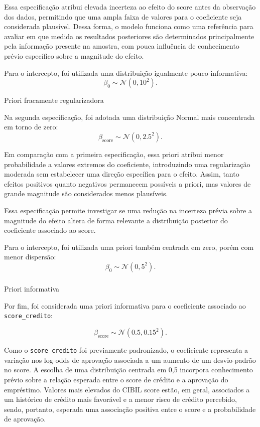 \documentclass[
  brazilian,
  12pt,
  letterpaper,
  DIV=11,
  numbers=noendperiod]{scrartcl}
\makeatletter
\let\oldsubparagraph\subparagraph
\renewcommand{\subparagraph}{
    \@ifstar
      \xxxSubParagraphStar
      \xxxSubParagraphNoStar
  }
\newcommand{\xxxSubParagraphStar}[1]{\oldsubparagraph*{#1}\mbox{}}
\newcommand{\xxxSubParagraphNoStar}[1]{\oldsubparagraph{#1}\mbox{}}
\makeatother
\begin{document}
Essa especificação atribui elevada incerteza ao efeito do score antes da
observação dos dados, permitindo que uma ampla faixa de valores para o
coeficiente seja considerada plausível. Dessa forma, o modelo funciona
como uma referência para avaliar em que medida os resultados posteriores
são determinados principalmente pela informação presente na amostra, com
pouca influência de conhecimento prévio específico sobre a magnitude do
efeito.

Para o intercepto, foi utilizada uma distribuição igualmente pouco
informativa: \[
\beta_{\text{0}} \sim \mathcal{N}(0,10^2).
\]

Priori fracamente regularizadora

Na segunda especificação, foi adotada uma distribuição Normal mais
concentrada em torno de zero: \[
\beta_{\text{score}} \sim \mathcal{N}(0,2.5^2).
\]

Em comparação com a primeira especificação, essa priori atribui menor
probabilidade a valores extremos do coeficiente, introduzindo uma
regularização moderada sem estabelecer uma direção específica para o
efeito. Assim, tanto efeitos positivos quanto negativos permanecem
possíveis a priori, mas valores de grande magnitude são considerados
menos plausíveis.

Essa especificação permite investigar se uma redução na incerteza prévia
sobre a magnitude do efeito altera de forma relevante a distribuição
posterior do coeficiente associado ao score.

Para o intercepto, foi utilizada uma priori também centrada em zero,
porém com menor dispersão: \[
\beta_{\text{0}} \sim \mathcal{N}(0,5^2).
\]

\subparagraph{Priori informativa}\label{priori-informativa}

Por fim, foi considerada uma priori informativa para o coeficiente
associado ao \texttt{score\_credito}:

\[
\beta_{\text{score}} \sim \mathcal{N}(0.5,0.15^2).
\]

Como o \texttt{score\_credito} foi previamente padronizado, o
coeficiente representa a variação nos log-odds de aprovação associada a
um aumento de um desvio-padrão no score. A escolha de uma distribuição
centrada em 0,5 incorpora conhecimento prévio sobre a relação esperada
entre o score de crédito e a aprovação do empréstimo. Valores mais
elevados do CIBIL score estão, em geral, associados a um histórico de
crédito mais favorável e a menor risco de crédito percebido, sendo,
portanto, esperada uma associação positiva entre o score e a
probabilidade de aprovação.
\end{document}
